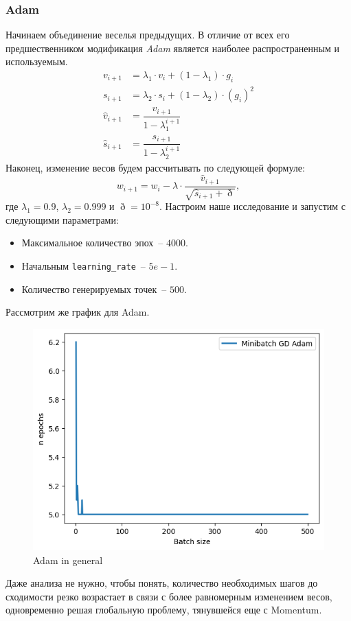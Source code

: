\documentclass[12pt, a4paper, oneside, final]{article}
\begin{document}
	\subsubsection*{Adam}
	Начинаем объединение веселья предыдущих.
	В отличие от всех его предшественником модификация \textit{Adam} является наиболее распространенным и используемым.
	\begin{align*}
		v_{i + 1} &= \lambda_{1} \cdot v_{i} + (1 - \lambda_{1}) \cdot g_{i} \\
		s_{i + 1} &= \lambda_{2} \cdot s_{i} + (1 - \lambda_{2}) \cdot (g_{i})^{2} \\
		\hat{v}_{i + 1} &= \dfrac{v_{i + 1}}{1 - \lambda_{1}^{i + 1}} \\
		\hat{s}_{i + 1} &= \dfrac{s_{i + 1}}{1 - \lambda_{2}^{i + 1}}
	\end{align*}
	Наконец, изменение весов будем рассчитывать по следующей формуле:
	\[
		w_{i + 1} = w_{i} - \lambda \cdot \dfrac{\hat{v}_{i + 1}}{\sqrt{\hat{s}_{i + 1} + \eth}},
	\] где $\lambda_{1} = 0.9$, $\lambda_{2} = 0.999$ и $\eth = 10^{-8}$.
	Настроим наше исследование и запустим с следующими параметрами:
	\begin{itemize}
		\item Максимальное количество эпох~-- $4000$.
		\item Начальным \texttt{learning\_rate}~-- $5e-1$.
		\item Количество генерируемых точек~-- $500$.
	\end{itemize}
	Рассмотрим же график для Adam.
	\begin{figure}[H]
		\centering
		\includegraphics[scale = 0.9]{Image/T3_ADAM_GENERAL.png}
		\caption*{Adam in general}
	\end{figure}
	Даже анализа не нужно, чтобы понять, количество необходимых шагов до сходимости резко возрастает в связи с более равномерным изменением весов, одновременно решая глобальную проблему, тянувшейся еще с Momentum.
\end{document}
